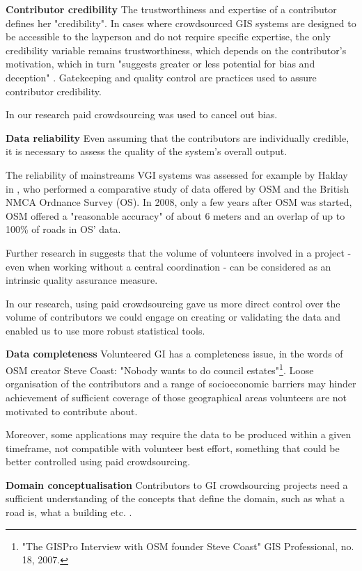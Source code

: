 \textbf{Contributor credibility} The trustworthiness and expertise of a contributor defines her "credibility". In cases where crowdsourced GIS systems are designed to be accessible to the layperson and do not require specific expertise, the only credibility variable remains trustworthiness, which depends on the contributor's motivation, which in turn "suggests greater or less potential for bias and deception" \cite{Flanagin:2008ck}. Gatekeeping and quality control are practices used to assure contributor credibility. 

In our research paid crowdsourcing was used to cancel out bias.

\textbf{Data reliability} Even assuming that the contributors are individually credible, it is necessary to assess the quality of the system's overall output. 

The reliability of mainstreams VGI systems was assessed for example by Haklay in \cite{Haklay:2010vs}, who performed a comparative study of data offered by OSM and the British NMCA Ordnance Survey (OS). In 2008, only a few years after OSM was started, OSM offered a "reasonable accuracy" of about 6 meters and an overlap of up to 100\% of roads in OS' data. 

Further research in \cite{Haklay:2010wf} suggests that the volume of volunteers involved in a project - even when working without a central coordination - can be considered as an intrinsic quality assurance measure.

In our research, using paid crowdsourcing gave us more direct control over the volume of contributors we could engage on creating or validating the data and enabled us to use more robust statistical tools.

\textbf{Data completeness} Volunteered GI has a completeness issue, in the words of OSM creator Steve Coast: "Nobody wants to do council estates"\footnote{"The GISPro Interview with OSM founder Steve Coast" GIS Professional, no. 18, 2007.}. Loose organisation of the contributors and a range of socioeconomic barriers \cite{Haklay:2010vs} may hinder achievement of sufficient coverage of those geographical areas volunteers are not motivated to contribute about.

Moreover, some applications may require the data to be produced within a given timeframe, not compatible with volunteer best effort, something that could be better controlled using paid crowdsourcing.

\textbf{Domain conceptualisation} Contributors to GI crowdsourcing projects need a sufficient understanding of the concepts that define the domain, such as what a road is, what a building etc. \cite{Ballatore:2015kg}. 

